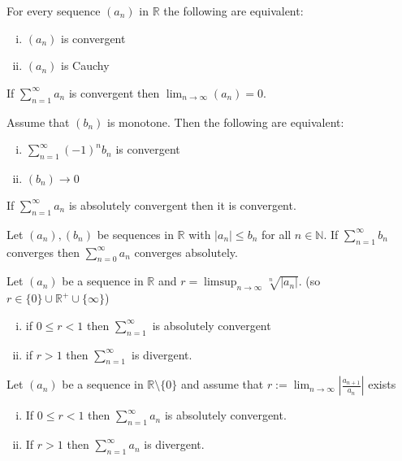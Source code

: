 \documentclass{report}
\theoremstyle{definition}
\begin{document}
\begin{seqt}
    For every sequence $(a_n)$ in $\mathbb{R}$ the following are equivalent:
    \begin{enumerate}[(i)]
        \item $(a_n)$ is convergent
        \item $(a_n)$ is Cauchy
    \end{enumerate}
\end{seqt}

\begin{seql}
    If $\sum_{n = 1}^{\infty}a_n$ is convergent then $\lim_{n\to\infty}(a_n) = 0$.
\end{seql}

\begin{seqt}
    Assume that $(b_n)$ is monotone. Then the following are equivalent:
    \begin{enumerate}[(i)]
        \item $\sum_{n = 1}^{\infty}(-1)^nb_n$ is convergent
        \item $(b_n) \to 0$
    \end{enumerate}
\end{seqt}

\begin{seql}
    If $\sum_{n=1}^{\infty}a_n$ is absolutely convergent then it is convergent.
\end{seql}

\begin{seql}
    Let $(a_n), (b_n)$ be sequences in $\mathbb{R}$ with $|a_n| \leq b_n$ for all $n\in\mathbb{N}$.
    If $\sum_{n = 1}^{\infty}b_n$ converges then $\sum_{n = 0}^{\infty}a_n$ converges absolutely.
\end{seql}

\begin{seqt}
    Let $(a_n)$ be a sequence in $\mathbb{R}$ and $r = \limsup_{n\to\infty}\sqrt[n]{|a_n|}$. (so $r\in\{0\}\cup\mathbb{R}^+\cup\{\infty\}$)
    \begin{enumerate}[(i)]
        \item if $0 \leq r < 1$ then $\sum_{n = 1}^{\infty}$ is absolutely convergent
        \item if $r > 1$ then $\sum_{n=1}^{\infty}$ is divergent.
    \end{enumerate}
\end{seqt}

\begin{seqc}
    Let $(a_n)$ be a sequence in $\mathbb{R}\setminus\{0\}$ and assume that $r:=\lim_{n\to\infty}|\frac{a_{n+1}}{a_n}|$ exists
    \begin{enumerate}[(i)]
        \item If $0\leq r < 1$ then $\sum_{n=1}^{\infty}a_n$ is absolutely convergent.
        \item If $r > 1$ then $\sum_{n=1}^{\infty}a_n$ is divergent.
    \end{enumerate}
\end{seqc}
\end{document}
